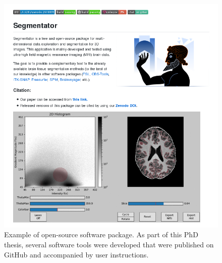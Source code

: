 \begin{figure}[!htbp]
\centering
\includegraphics[width=\textwidth]{figures/valorization/segmentator_readme.png}
\caption{Example of open-source software package. As part of this PhD thesis, several software tools were developed that were published on GitHub and accompanied by user instructions.}
\label{fig:open_source_tool} 
\end{figure}
\stopsupplement

